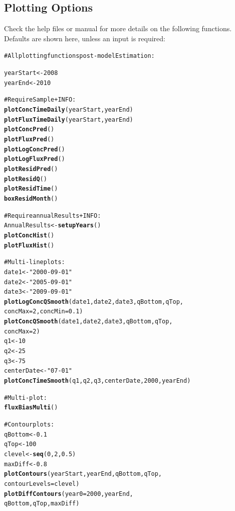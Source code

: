 \documentclass[a4paper,11pt]{article}\usepackage{graphicx, color}
\makeatletter
\newcommand{\hlfunctioncall}[1]{\textcolor[rgb]{0.501960784313725,0,0.329411764705882}{\textbf{#1}}}%
\newcommand{\hlstring}[1]{\textcolor[rgb]{0.6,0.6,1}{#1}}%
\newcommand{\hlcomment}[1]{\textcolor[rgb]{0.180392156862745,0.6,0.341176470588235}{#1}}%
\newenvironment{kframe}{%
 \def\at@end@of@kframe{}%
 \ifinner\ifhmode%
  \def\at@end@of@kframe{\end{minipage}}%
  \begin{minipage}{\columnwidth}%
 \fi\fi%
 \def\FrameCommand##1{\hskip\@totalleftmargin \hskip-\fboxsep
 \colorbox{shadecolor}{##1}\hskip-\fboxsep
     \hskip-\linewidth \hskip-\@totalleftmargin \hskip\columnwidth}%
 \MakeFramed {\advance\hsize-\width
   \@totalleftmargin\z@ \linewidth\hsize
   \@setminipage}}%
 {\par\unskip\endMakeFramed%
 \at@end@of@kframe}
\newenvironment{knitrout}{}{} %
\makeatother
\begin{document}
\subsection{Plotting Options}
\label{sec:wrtdsPlotting}
Check the help files or manual for more details on the following functions.  Defaults are shown here, unless an input is required:

\begin{knitrout}
\color{fgcolor}\begin{kframe}
\begin{alltt}
\hlcomment{#All plotting functions post-modelEstimation:}

yearStart <- 2008
yearEnd <- 2010

\hlcomment{#Require Sample + INFO:}
\hlfunctioncall{plotConcTimeDaily}(yearStart, yearEnd)
\hlfunctioncall{plotFluxTimeDaily}(yearStart, yearEnd)
\hlfunctioncall{plotConcPred}()
\hlfunctioncall{plotFluxPred}()
\hlfunctioncall{plotLogConcPred}()
\hlfunctioncall{plotLogFluxPred}()
\hlfunctioncall{plotResidPred}()
\hlfunctioncall{plotResidQ}()
\hlfunctioncall{plotResidTime}()
\hlfunctioncall{boxResidMonth}()

\hlcomment{#Require annualResults + INFO:}
AnnualResults <- \hlfunctioncall{setupYears}()
\hlfunctioncall{plotConcHist}()
\hlfunctioncall{plotFluxHist}()

\hlcomment{# Multi-line plots:}
date1 <- \hlstring{"2000-09-01"}
date2 <- \hlstring{"2005-09-01"}
date3 <- \hlstring{"2009-09-01"}
\hlfunctioncall{plotLogConcQSmooth}(date1, date2, date3, qBottom, qTop, 
                   concMax=2, concMin=0.1)
\hlfunctioncall{plotConcQSmooth}(date1, date2, date3, qBottom, qTop, 
                   concMax=2)
q1 <- 10
q2 <- 25
q3 <- 75
centerDate <- \hlstring{"07-01"}
\hlfunctioncall{plotConcTimeSmooth}(q1, q2, q3, centerDate, 2000, yearEnd)

\hlcomment{# Multi-plot:}
\hlfunctioncall{fluxBiasMulti}()

\hlcomment{#Contour plots:}
qBottom<-0.1
qTop<-100
clevel<-\hlfunctioncall{seq}(0,2,0.5)
maxDiff<-0.8
\hlfunctioncall{plotContours}(yearStart,yearEnd,qBottom,qTop, 
             contourLevels = clevel)
\hlfunctioncall{plotDiffContours}(year0=2000,yearEnd,
                 qBottom,qTop,maxDiff)
\end{alltt}
\end{kframe}
\end{knitrout}
\end{document}
